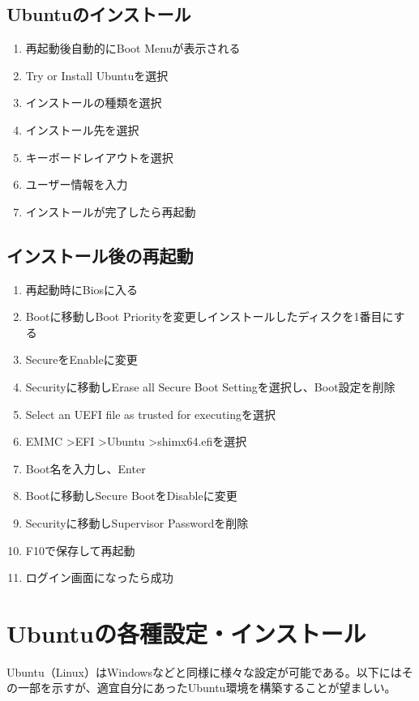 \documentclass[a4paper, 11pt, dvipdfmx]{jsarticle}
\begin{document}
\subsection{Ubuntuのインストール}
  \begin{enumerate}
    \item 再起動後自動的にBoot Menuが表示される
    \item Try or Install Ubuntuを選択
    \item インストールの種類を選択
    \item インストール先を選択
    \item キーボードレイアウトを選択
    \item ユーザー情報を入力
    \item インストールが完了したら再起動
  \end{enumerate}
\subsection{インストール後の再起動}
  \begin{enumerate}
    \item 再起動時にBiosに入る
    \item Bootに移動しBoot Priorityを変更しインストールしたディスクを1番目にする
    \item SecureをEnableに変更
    \item Securityに移動しErase all Secure Boot Settingを選択し、Boot設定を削除
    \item Select an UEFI file as trusted for executingを選択
    \item EMMC \textgreater EFI \textgreater Ubuntu \textgreater shimx64.efiを選択
    \item Boot名を入力し、Enter
    \item Bootに移動しSecure BootをDisableに変更
    \item Securityに移動しSupervisor Passwordを削除
    \item F10で保存して再起動
    \item ログイン画面になったら成功
  \end{enumerate}

\section{Ubuntuの各種設定・インストール}
Ubuntu（Linux）はWindowsなどと同様に様々な設定が可能である。以下にはその一部を示すが、適宜自分にあったUbuntu環境を構築することが望ましい。
\end{document}
